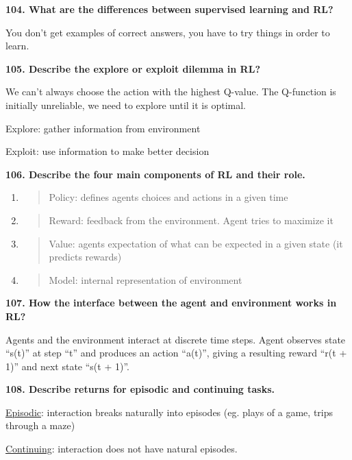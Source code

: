 \textbf{104. What are the differences between supervised learning and
RL?}

You don't get examples of correct answers, you have to try things in
order to learn.

\textbf{105. Describe the explore or exploit dilemma in RL?}

We can't always choose the action with the highest Q-value. The
Q-function is initially unreliable, we need to explore until it is
optimal.

Explore: gather information from environment

Exploit: use information to make better decision

\textbf{106. Describe the four main components of RL and their role.}

\begin{enumerate}
\def\labelenumi{\arabic{enumi}.}
\item
  \begin{quote}
  Policy: defines agents choices and actions in a given time
  \end{quote}
\item
  \begin{quote}
  Reward: feedback from the environment. Agent tries to maximize it
  \end{quote}
\item
  \begin{quote}
  Value: agents expectation of what can be expected in a given state (it
  predicts rewards)
  \end{quote}
\item
  \begin{quote}
  Model: internal representation of environment
  \end{quote}
\end{enumerate}

\textbf{107. How the interface between the agent and environment works
in RL?}

Agents and the environment interact at discrete time steps. Agent
observes state ``s(t)'' at step ``t'' and produces an action ``a(t)'',
giving a resulting reward ``r(t + 1)'' and next state ``s(t + 1)''.

\textbf{108. Describe returns for episodic and continuing tasks.}

\underline{Episodic}: interaction breaks naturally into episodes (eg.
plays of a game, trips through a maze)

\underline{Continuing}: interaction does not have natural episodes.

